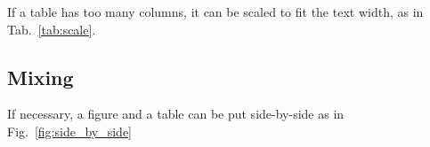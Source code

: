 If a table has too many columns, it can be scaled to fit the text width, as in Tab.~\ref{tab:scale}.
%
\begin{table}[!htb]
  \caption{Very wide table.}
  \label{tab:scale}%
  \renewcommand{\arraystretch}{1.2} %
  \centering
\end{table}


\subsection{Mixing}
\label{section:mixing}

If necessary, a figure and a table can be put side-by-side as in Fig.~\ref{fig:side_by_side}

